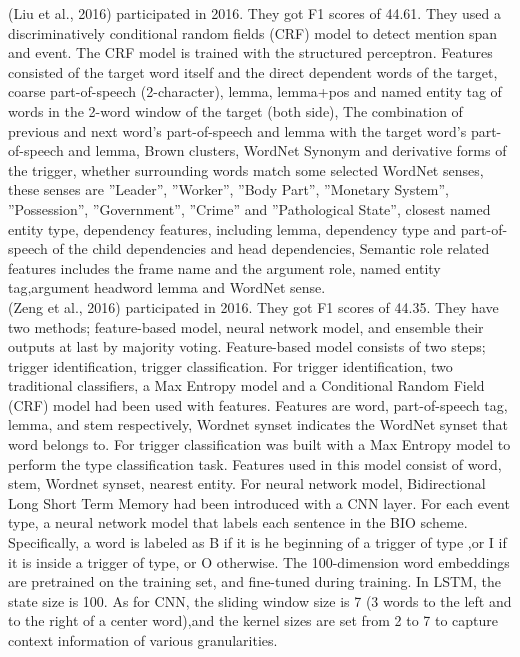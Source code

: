 \indent (Liu et al., 2016) participated in 2016. They got F1 scores of 44.61. They used a discriminatively conditional random ﬁelds (CRF) model to detect mention span and event. The CRF model is trained with the structured perceptron. Features consisted of the target word itself and the direct dependent words of the target, coarse part-of-speech (2-character), lemma, lemma+pos and named entity tag of words in the 2-word window of the target (both side), The combination of previous and next word’s part-of-speech and lemma with the target word’s part-of-speech and lemma, Brown clusters, WordNet Synonym and derivative forms of the trigger, whether surrounding words match some selected WordNet senses, these senses are ”Leader”, ”Worker”, ”Body Part”, ”Monetary System”, ”Possession”, ”Government”, ”Crime” and ”Pathological State”, closest named entity type, dependency features, including lemma, dependency type and part-of-speech of the child dependencies and head dependencies, Semantic role related features includes the frame name and the argument role, named entity tag,argument headword lemma and WordNet sense.\\
\indent (Zeng et al., 2016) participated in 2016. They got F1 scores of 44.35. They have two methods; feature-based model, neural network model, and ensemble their outputs at last by majority voting. Feature-based model consists of two steps; trigger identiﬁcation, trigger classification. For trigger identification, two traditional classiﬁers, a Max Entropy model and a Conditional Random Field (CRF) model had been used with features. Features are word, part-of-speech tag, lemma, and stem respectively, Wordnet synset indicates the WordNet synset that word belongs to. For trigger classiﬁcation was built with a Max Entropy model to perform the type classiﬁcation task. Features used in this model consist of  word, stem, Wordnet synset, nearest entity. For neural network model, Bidirectional Long Short Term Memory had been introduced with a CNN layer. For each event type, a neural network model that labels each sentence in the BIO scheme. Speciﬁcally, a word is labeled as B if it is he beginning of a trigger of type ,or I if it is inside a trigger of type, or O otherwise. The 100-dimension word embeddings are pretrained on the training set, and ﬁne-tuned during training. In LSTM, the state size is 100. As for CNN, the sliding window size is 7 (3 words to the left and to the right of a center word),and the kernel sizes are set from 2 to 7 to capture context information of various granularities.\\
